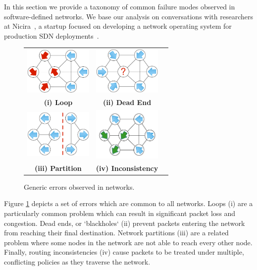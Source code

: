 
In this section we provide a taxonomy of common failure modes observed in
software-defined networks. We base our analysis on conversations with
researchers at Nicira~\cite{nicira}, a startup focused on developing a network operating
system for production SDN deployments~\cite{onix}.

\begin{figure}[t]
    \centering
    \begin{tabular}{ccc}
    \hspace{-5pt}\includegraphics[width=1.3in]{../diagrams/bugs/loop.pdf}&
    \includegraphics[width=1.3in]{../diagrams/bugs/dead_end.pdf}& \\
    {\bf (i) Loop}&{\bf (ii) Dead End}& \\
    \includegraphics[width=1.3in]{../diagrams/bugs/partition.pdf}&
    \includegraphics[width=1.3in]{../diagrams/bugs/routing_inconsistency.pdf}\\
     {\bf (iii) Partition}&{\bf (iv) Inconsistency}
    \end{tabular}
    \caption[]{\label{fig:generic_errors} Generic errors observed in
    networks.\vspace{-10pt}} 
\end{figure}

Figure \ref{fig:generic_errors} depicts a set of errors which are
common to all networks. Loops (i) are a particularly common problem which
can result in significant packet loss and congestion. Dead ends, or
`blackholes` (ii) prevent packets entering the network from reaching their
final destination. Network partitions (iii) are a related problem where
some nodes in the network are not able to reach every other node. Finally, routing
inconsistencies (iv) cause packets to be treated under multiple, conflicting policies as
they traverse the network. 

